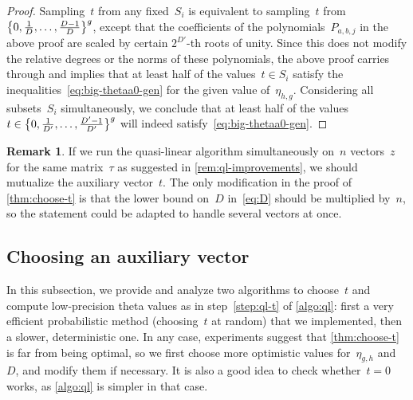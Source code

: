 \documentclass[12pt,oneside]{amsart}
\numberwithin{equation}{section}
\theoremstyle{definition}
\newtheorem{rem}[equation]{Remark}
\DeclarePairedDelimiter{\set}{\{}{\}}
\begin{document}
\begin{proof}
  Sampling~$t$ from any fixed~$S_i$ is equivalent to sampling~$t$
  from~$\set[\big]{0,\tfrac{1}{D},\ldots,\tfrac{D-1}{D}}^g$, except that the
  coefficients of the polynomials~$P_{a,b,j}$ in the above proof are scaled by
  certain $2^{D'}$-th roots of unity. Since this does not modify the relative
  degrees or the norms of these polynomials, the above proof carries through
  and implies that at least half of the values~$t\in S_i$ satisfy the
  inequalities~\eqref{eq:big-thetaa0-gen} for the given value
  of~$\eta_{h,g}$. Considering all subsets~$S_i$ simultaneously, we conclude
  that at least half of the
  values~$t\in \set[\big]{0,\tfrac{1}{D'},\ldots,\tfrac{D'-1}{D'}}^g$ will
  indeed satisfy~\eqref{eq:big-thetaa0-gen}.
\end{proof}

\begin{rem}
  \label{rem:several-z} If we run the quasi-linear algorithm simultaneously
  on~$n$ vectors~$z$ for the same matrix~$\tau$ as suggested in
  \cref{rem:ql-improvements}, we should mutualize the auxiliary vector~$t$. The
  only modification in the proof of \cref{thm:choose-t} is that the lower bound
  on~$D$ in~\eqref{eq:D} should be multiplied by~$n$, so the statement could be
  adapted to handle several vectors at once.
\end{rem}



\subsection{Choosing an auxiliary vector}
\label{subsec:choose-t}

In this subsection, we provide and analyze two algorithms to choose~$t$ and
compute low-precision theta values as in step~\eqref{step:ql-t} of
\cref{algo:ql}: first a very efficient probabilistic method (choosing~$t$ at
random) that we implemented, then a slower, deterministic one. In any case, experiments suggest
that \cref{thm:choose-t} is far from being optimal, so we first choose more
optimistic values for~$\eta_{g,h}$ and~$D$, and modify them if necessary. It is
also a good idea to check whether~$t=0$ works, as \cref{algo:ql} is simpler in
that case.
\end{document}
